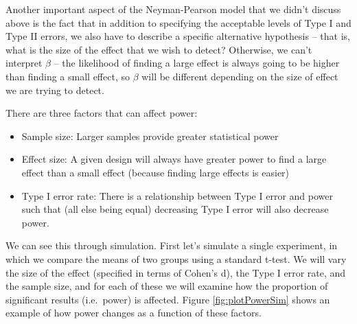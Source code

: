 \documentclass[]{book}
\providecommand{\tightlist}{%
  \setlength{\itemsep}{0pt}\setlength{\parskip}{0pt}}
\theoremstyle{definition}
\theoremstyle{definition}
\theoremstyle{definition}
\theoremstyle{remark}
\begin{document}
Another important aspect of the Neyman-Pearson model that we didn't
discuss above is the fact that in addition to specifying the acceptable
levels of Type I and Type II errors, we also have to describe a specific
alternative hypothesis -- that is, what is the size of the effect that
we wish to detect? Otherwise, we can't interpret \(\beta\) -- the
likelihood of finding a large effect is always going to be higher than
finding a small effect, so \(\beta\) will be different depending on the
size of effect we are trying to detect.

There are three factors that can affect power:

\begin{itemize}
\tightlist
\item
  Sample size: Larger samples provide greater statistical power
\item
  Effect size: A given design will always have greater power to find a
  large effect than a small effect (because finding large effects is
  easier)
\item
  Type I error rate: There is a relationship between Type I error and
  power such that (all else being equal) decreasing Type I error will
  also decrease power.
\end{itemize}

We can see this through simulation. First let's simulate a single
experiment, in which we compare the means of two groups using a standard
t-test. We will vary the size of the effect (specified in terms of
Cohen's d), the Type I error rate, and the sample size, and for each of
these we will examine how the proportion of significant results
(i.e.~power) is affected. Figure \ref{fig:plotPowerSim} shows an example
of how power changes as a function of these factors.
\end{document}
